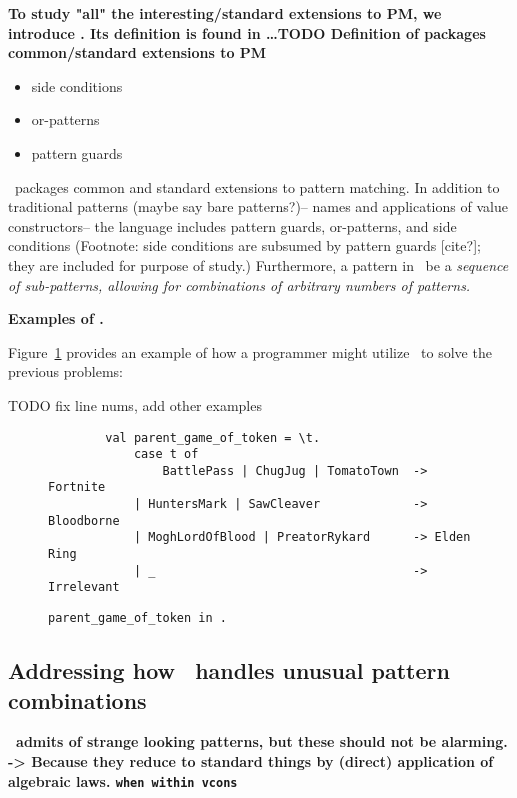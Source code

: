 \documentclass[manuscript,screen,review, 12pt]{acmart}
\begin{document}
\begin{outline}[enumerate]
    \1 \bf{To study "all" the interesting/standard extensions to PM, we introduce}
    \PPlus. Its definition is found in \dots TODO 
    \2 \bf{Definition of \PPlus}
    \2 \bf{{\PPlus} packages common/standard extensions to PM}
    \begin{itemize}
        \item side conditions
        \item or-patterns 
        \item pattern guards 
    \end{itemize}

    \PPlus\ packages common and standard extensions to pattern matching. In
    addition to traditional patterns (maybe say bare patterns?)-- names and
    applications of value constructors-- the language includes pattern guards,
    or-patterns, and side conditions (Footnote: side conditions are subsumed by
    pattern guards [cite?]; they are included for purpose of study.)
    Furthermore, a pattern in \PPlus\ be a \it{sequence} of sub-patterns,
    allowing for combinations of arbitrary numbers of patterns. 
    
    \3 \bf{Examples of \PPlus. }

    Figure~\ref{fig:ppexs} provides an example of how a programmer might utilize
    \PPlus\ to solve the previous problems: 

    TODO fix line nums, add other examples 
    \begin{figure}
        \begin{center}
            \pplst 
            \begin{lstlisting}
        val parent_game_of_token = \t. 
            case t of  
                BattlePass | ChugJug | TomatoTown  -> Fortnite
            | HuntersMark | SawCleaver             -> Bloodborne
            | MoghLordOfBlood | PreatorRykard      -> Elden Ring
            | _                                    -> Irrelevant
        \end{lstlisting}
        \end{center}    
        \caption{\tt{parent\_game\_of\_token} in \PPlus.} 
        \label{fig:ppexs}
        \end{figure}
    
    
\subsection{Addressing how \PPlus\ handles unusual pattern combinations}
\2 \bf{\PPlus\ admits of strange looking patterns, but these should not be alarming. }
\2 \bf{-> Because they reduce to standard things by (direct) application of algebraic laws. }
\3 \bf{\tt{when} within vcons }


\end{outline}
\end{document}
